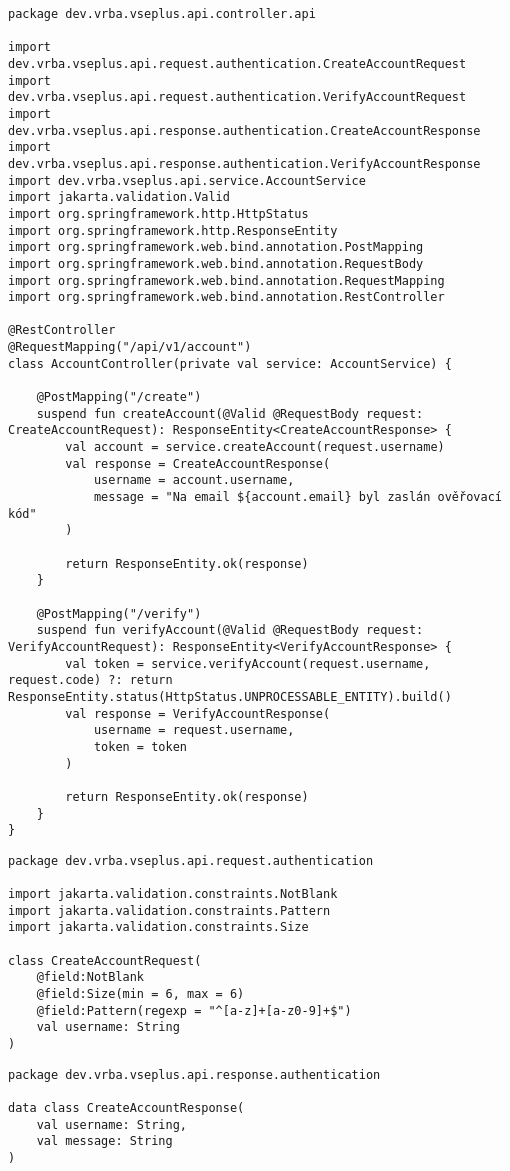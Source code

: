 \begin{lstlisting}[label={code:accounts-controller}, caption={Definice třídy kontroleru pro uživatelské účty}]
package dev.vrba.vseplus.api.controller.api

import dev.vrba.vseplus.api.request.authentication.CreateAccountRequest
import dev.vrba.vseplus.api.request.authentication.VerifyAccountRequest
import dev.vrba.vseplus.api.response.authentication.CreateAccountResponse
import dev.vrba.vseplus.api.response.authentication.VerifyAccountResponse
import dev.vrba.vseplus.api.service.AccountService
import jakarta.validation.Valid
import org.springframework.http.HttpStatus
import org.springframework.http.ResponseEntity
import org.springframework.web.bind.annotation.PostMapping
import org.springframework.web.bind.annotation.RequestBody
import org.springframework.web.bind.annotation.RequestMapping
import org.springframework.web.bind.annotation.RestController

@RestController
@RequestMapping("/api/v1/account")
class AccountController(private val service: AccountService) {

    @PostMapping("/create")
    suspend fun createAccount(@Valid @RequestBody request: CreateAccountRequest): ResponseEntity<CreateAccountResponse> {
        val account = service.createAccount(request.username)
        val response = CreateAccountResponse(
            username = account.username,
            message = "Na email ${account.email} byl zaslán ověřovací kód"
        )

        return ResponseEntity.ok(response)
    }

    @PostMapping("/verify")
    suspend fun verifyAccount(@Valid @RequestBody request: VerifyAccountRequest): ResponseEntity<VerifyAccountResponse> {
        val token = service.verifyAccount(request.username, request.code) ?: return ResponseEntity.status(HttpStatus.UNPROCESSABLE_ENTITY).build()
        val response = VerifyAccountResponse(
            username = request.username,
            token = token
        )

        return ResponseEntity.ok(response)
    }
}
\end{lstlisting}

\begin{lstlisting}[label={code:create-account-request}, caption={Definice třídy \code{CreateAccountRequest} sloužící pro přenos dat}]
package dev.vrba.vseplus.api.request.authentication

import jakarta.validation.constraints.NotBlank
import jakarta.validation.constraints.Pattern
import jakarta.validation.constraints.Size

class CreateAccountRequest(
    @field:NotBlank
    @field:Size(min = 6, max = 6)
    @field:Pattern(regexp = "^[a-z]+[a-z0-9]+$")
    val username: String
)
\end{lstlisting}

\begin{lstlisting}[label={code:create-account-response}, caption={Definice třídy \code{CreateAccountResponse} sloužící pro přenos dat}]
package dev.vrba.vseplus.api.response.authentication

data class CreateAccountResponse(
    val username: String,
    val message: String
)
\end{lstlisting}
